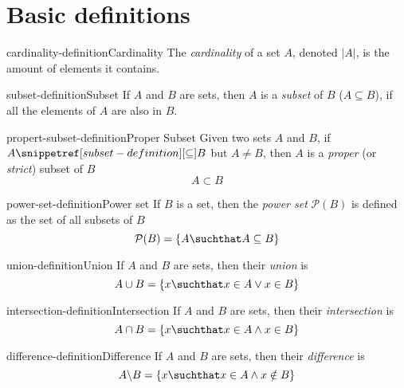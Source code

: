 \documentclass[preview]{standalone}
\begin{document}
\genpage


\section{Basic definitions}

\begin{snippetdefinition}{cardinality-definition}{Cardinality}
    The \textit{cardinality} of a set \(A\), denoted \(|A|\),
    is the amount of elements it contains.
\end{snippetdefinition}

\begin{snippetdefinition}{subset-definition}{Subset}
    If \(A\) and \(B\) are sets, then \(A\) is a \textit{subset} of \(B\)
    (\(A\subseteq B\)), if all the elements of \(A\) are also in \(B\).
\end{snippetdefinition}

\begin{snippetdefinition}{propert-subset-definition}{Proper Subset}
    Given two sets \(A\) and \(B\), if \(A \snippetref[subset-definition][\subseteq] B\) but \(A \neq B\),
    then \(A\) is a \textit{proper} (or \textit{strict}) subset of \(B\)
    \[
        A \subset B
    \]
\end{snippetdefinition}

\begin{snippetdefinition}{power-set-definition}{Power set}
    If \(B\) is a set, then the \textit{power set} \(\mathcal{P}(B)\)
    is defined as the set of all subsets of \(B\)
    \[
        \mathcal{P}(B)=\{A \suchthat A\subseteq B\}
    \]
\end{snippetdefinition}

\begin{snippetdefinition}{union-definition}{Union}
    If \(A\) and \(B\) are sets, then their \textit{union} is
    \[
        A \cup B = \{x \suchthat x \in A \lor x \in B\}
    \]
\end{snippetdefinition}

\begin{snippetdefinition}{intersection-definition}{Intersection}
    If \(A\) and \(B\) are sets, then their \textit{intersection} is
    \[
        A \cap B = \{x \suchthat x \in A \land x \in B\}
    \]
\end{snippetdefinition}

\begin{snippetdefinition}{difference-definition}{Difference}
    If \(A\) and \(B\) are sets, then their \textit{difference} is
    \[
        A \backslash B = \{x \suchthat x \in A \land x \notin B\}
    \]
\end{snippetdefinition}
\end{document}
